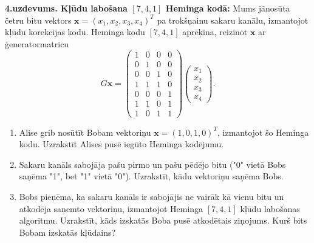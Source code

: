 \documentclass[a4paper,12pt]{article}
\begin{document}
\vspace{6pt}
{\bf 4.uzdevums. Kļūdu labošana $[7,4,1]$ Heminga kodā:} 
Mums jānosūta četru bitu vektors $\mathbf{x}=(x_1,x_2,x_3,x_4)^T$ 
pa trokšņainu sakaru kanālu, izmantojot kļūdu korekcijas kodu. 
Heminga kodu  $[7,4,1]$ aprēķina, reizinot $\mathbf{x}$ ar 
ģeneratormatricu
$$G\mathbf{x} = \left(
\begin{array}{cccc}
1 & 0 & 0 & 0 \\
0 & 1 & 0 & 0 \\
0 & 0 & 1 & 0 \\
1 & 1 & 1 & 0 \\
0 & 0 & 0 & 1 \\
1 & 1 & 0 & 1 \\
1 & 0 & 1 & 1 
\end{array} \right) \left( \begin{array}{c}
x_1\\
x_2\\
x_3\\
x_4
\end{array} \right).$$
\begin{enumerate}[label=(\alph*)]
\item Alise grib nosūtīt Bobam vektoriņu $\mathbf{x} = (1,0,1,0)^T$, izmantojot šo Heminga kodu.
Uzrakstīt Alises pusē iegūto Heminga kodējumu.
\item Sakaru kanāls sabojāja pašu pirmo un pašu pēdējo bitu ("0" vietā Bobs saņēma "1",
bet "1" vietā "0"). Uzrakstīt, kādu vektoriņu saņēma Bobs.
\item Bobs pieņēma, ka sakaru kanāls ir sabojājis ne vairāk kā vienu bitu un atkodēja
saņemto vektoriņu, izmantojot Heminga $[7,4,1]$ kļūdu labošanas algoritmu. 
Uzrakstīt, kāds izskatās Boba pusē atkodētais ziņojums.
Kurš bits Bobam izskatās kļūdains?
\end{enumerate}
\end{document}
